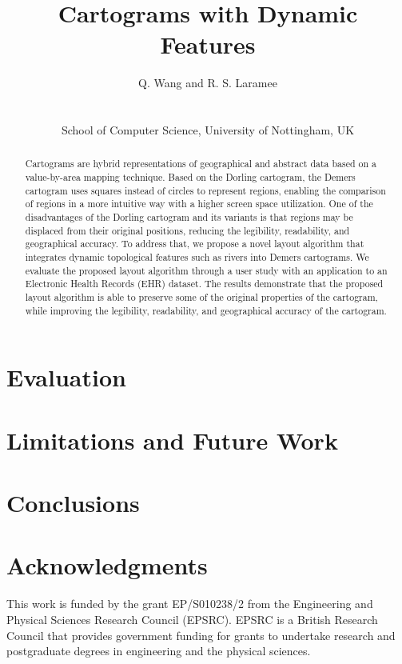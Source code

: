 \documentclass{egpubl}
\author[Q. Wang \& R. S. Laramee]
{\parbox{\textwidth}{\centering Q. Wang
  and R. S. Laramee
    }
    \\
\parbox{\textwidth}{\centering School of Computer Science, University of Nottingham, UK}
}
\title{Cartograms with Dynamic Features}
\begin{document}
\pagestyle{plain}

\maketitle

\begin{abstract}
Cartograms are hybrid representations of geographical and abstract data based on a value-by-area mapping technique. Based on the Dorling cartogram, the Demers cartogram uses squares instead of circles to represent regions, enabling the comparison of regions in a more intuitive way with a higher screen space utilization. One of the disadvantages of the Dorling cartogram and its variants is that regions may be displaced from their original positions, reducing the legibility, readability, and geographical accuracy. To address that, we propose a novel layout algorithm that integrates dynamic topological features such as rivers into Demers cartograms. We evaluate the proposed layout algorithm through a user study with an application to an Electronic Health Records (EHR) dataset. The results demonstrate that the proposed layout algorithm is able to preserve some of the original properties of the cartogram, while improving the legibility, readability, and geographical accuracy of the cartogram. 
\end{abstract}









\section{Evaluation}

\section{Limitations and Future Work}

\section{Conclusions}

\section{Acknowledgments}
This work is funded by the grant EP/S010238/2 from the Engineering and Physical Sciences Research Council (EPSRC). EPSRC is a British Research Council that provides government funding for grants to undertake research and postgraduate degrees in engineering and the physical sciences.


\clearpage
\let\section=\origsection
\printbibliography

\cleardoublepage


\end{document}
